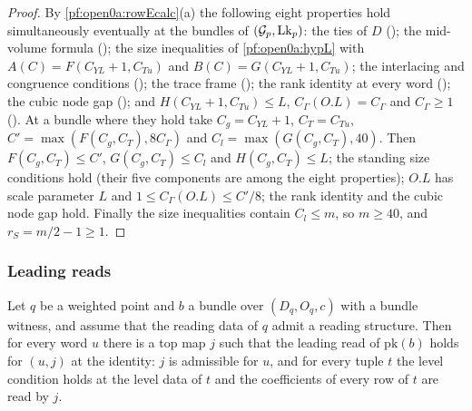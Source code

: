 \begin{proof}
By \cref{pf:open0a:rowEcalc}(a) the following eight properties hold simultaneously eventually at the bundles of
$(\mathcal G_p,\mathrm{Lk}_p)$: the ties of $D$ (); the mid-volume
formula (); the size inequalities of \cref{pf:open0a:hypL} with
$A(C)=F(C_{YL}+1,C_{Tu})$ and $B(C)=G(C_{YL}+1,C_{Tu})$; the interlacing and congruence conditions
(); the trace frame
(); the rank identity at every word
(); the cubic node gap
(); and $H(C_{YL}+1,C_{Tu})\le L$, $C_\Gamma(O.L)=C_\Gamma$ and
$C_\Gamma\ge1$ (). At a bundle where they hold
take $C_g=C_{YL}+1$, $C_T=C_{Tu}$, $C'=\max(F(C_g,C_T),8C_\Gamma)$ and $C_l=\max(G(C_g,C_T),40)$. Then
$F(C_g,C_T)\le C'$, $G(C_g,C_T)\le C_l$ and $H(C_g,C_T)\le L$; the standing size conditions hold (their five components
are among the eight properties); $O.L$ has scale parameter $L$ and $1\le C_\Gamma(O.L)\le C'/8$; the rank identity and
the cubic node gap hold. Finally the size inequalities contain $C_l\le m$, so $m\ge40$, and $r_S=m/2-1\ge1$.
\end{proof}

\subsubsection{Leading reads}

\begin{lemma}\label{pf:open0a:readat}
Let $q$ be a weighted point and $b$ a bundle over $(D_q,O_q,c)$ with a bundle witness, and assume that the reading data
of $q$ admit a reading structure. Then for every word $u$ there is a top map $j$ such that the leading read of
$\mathrm{pk}(b)$ holds for $(u,j)$ at the identity: $j$ is admissible for $u$, and for every tuple $t$ the level
condition holds at the level data of $t$ and the coefficients of every row of $t$ are read by $j$.
\end{lemma}

